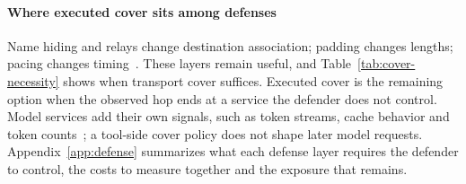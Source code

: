 \paragraph{Where executed cover sits among defenses}
Name hiding and relays change destination association; padding changes lengths; pacing changes timing~\cite{wang2017walkietalkie,gong2020front,juarez2016wtfpad}. These layers remain useful, and Table~\ref{tab:cover-necessity} shows when transport cover suffices. Executed cover is the remaining option when the observed hop ends at a service the defender does not control. Model services add their own signals, such as token streams, cache behavior and token counts~\cite{weiss2024prompt,whisperleak2025,earlybird2025,timewilltell2024,carlini2024timing}; a tool-side cover policy does not shape later model requests. Appendix~\ref{app:defense} summarizes what each defense layer requires the defender to control, the costs to measure together and the exposure that remains.
